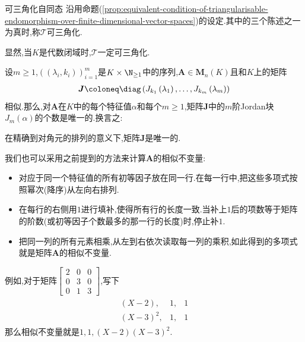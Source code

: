 \begin{definition}{可三角化自同态}{}
	沿用命题(\ref{prop:equivalent-condition-of-triangularisable-endomorphism-over-finite-dimensional-vector-spaces})的设定.其中的三个陈述之一为真时,称$\mathcal{T}$可三角化.
\end{definition}

\begin{remark}{}{}
	显然,当$K$是代数闭域时,$\mathcal{T}$一定可三角化.
\end{remark}

\begin{remark}{}{}
	设$m\geq 1$,$\left(\left(\lambda_{i},k_{i}\right)\right)_{i=1}^{m}$是$K\times\N_{\geq 1}$中的序列,$\boldsymbol{A}\in\mathbf{M}_{n}\left(K\right)$且和$K$上的矩阵
	\begin{align*}
		\boldsymbol{J}\coloneq\diag\left(J_{k_{1}}\left(\lambda_{1}\right),\ldots,J_{k_{m}}\left(\lambda_{m}\right)\right)
	\end{align*}
	相似.那么,对$\boldsymbol{A}$在$K$中的每个特征值$\alpha$和每个$m\geq 1$,矩阵$\boldsymbol{J}$中的$m$阶Jordan块$J_{m}\left(\alpha\right)$的个数是唯一的.换言之:
	\begin{center}
		在精确到对角元的排列的意义下,矩阵$\boldsymbol{J}$是唯一的.
	\end{center}
	
	我们也可以采用之前提到的方法来计算$\boldsymbol{A}$的相似不变量:
	\begin{itemize}
		\item 对应于同一个特征值的所有初等因子放在同一行.在每一行中,把这些多项式按照幂次(降序)从左向右排列.
		\item 在每行的右侧用$1$进行填补,使得所有行的长度一致.当补上$1$后的项数等于矩阵的阶数(或初等因子个数最多的那一行的长度)时,停止补$1$.
		\item 把同一列的所有元素相乘,从左到右依次读取每一列的乘积,如此得到的多项式就是矩阵$\boldsymbol{A}$的相似不变量.
	\end{itemize}
	例如,对于矩阵$
	\begin{bmatrix}
		2&0&0\\
		0&3&0\\
		0&1&3
	\end{bmatrix}$,写下
	\begin{gather*}
		\begin{array}{rrr}
			\left(X-2\right),&1,&1\\
			\left(X-3\right)^{2},&1,&1
		\end{array}
	\end{gather*}	
	那么相似不变量就是$1,1,(X-2)(X-3)^{2}$.
\end{remark}

